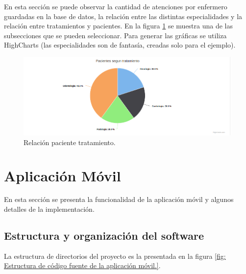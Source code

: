En esta sección se puede observar la cantidad de atenciones por enfermero guardadas en la base de datos, la relación entre las distintas especialidades y la relación entre tratamientos y pacientes. En la figura \ref{fig:Relación paciente tratamiento.} se muestra una de las subsecciones que se pueden seleccionar. Para generar las gráficas se utiliza HighCharts \citep{WEBSITE:33} (las especialidades son de fantasía, creadas solo para el ejemplo). 
\begin{figure}[ht]
	\centering
	\includegraphics[scale=.65]{./Figures/web/pacientes-Tratamiento.png}
	\caption{Relación paciente tratamiento.}
	\label{fig:Relación paciente tratamiento.}
\end{figure} 


\pagebreak
\section{Aplicación Móvil}
\label{Aplicación Móvil}
En esta sección se presenta la funcionalidad de la aplicación móvil y algunos detalles de la implementación.
\label{Estructura y organización del software}
\subsection{Estructura y organización del software}
La estructura de directorios del proyecto es la presentada en la figura \ref{fig: Estructura de código fuente de la aplicación móvil.}.


